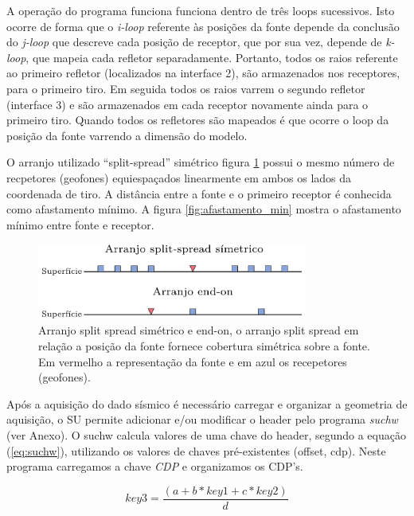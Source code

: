 A operação do programa funciona funciona dentro de três loops sucessivos. Isto ocorre de forma que o \textit{i-loop} referente às posições da fonte depende da conclusão do \textit{j-loop} que descreve cada posição de receptor, que por sua vez, depende de \textit{k-loop}, que mapeia cada refletor separadamente. Portanto, todos os raios referente ao primeiro refletor (localizados na interface 2), são armazenados nos receptores, para o primeiro tiro. Em seguida todos os raios varrem o segundo refletor (interface 3) e são armazenados em cada receptor novamente ainda para o primeiro tiro. Quando todos os refletores são mapeados é que ocorre o loop da posição da fonte varrendo a dimensão do modelo.

O arranjo utilizado ``split-spread'' simétrico figura \ref{fig:split_spread} possui o mesmo número de recpetores (geofones) equiespaçados linearmente em ambos os lados da coordenada de tiro. A distância entre a fonte e o primeiro receptor é conhecida como afastamento mínimo. A figura \ref{fig:afastamento_min} mostra o afastamento mínimo entre fonte e receptor.

\begin{figure}[H]
\centering
\includegraphics[height=2.5cm]{figuras/cap2/arranjo.pdf}
\caption{Arranjo split spread simétrico e end-on, o arranjo split spread em relação a posição da fonte fornece cobertura simétrica sobre a fonte. Em vermelho a representação da fonte e em azul os recepetores (geofones).}
\label{fig:split_spread}
\end{figure}

Após a aquisição do dado sísmico é necessário carregar e organizar a geometria de aquisição, o SU permite adicionar e/ou modificar o header pelo programa \textit{suchw} (ver Anexo). O suchw calcula valores de uma chave do header, segundo a equação (\ref{eq:suchw}), utilizando os valores de chaves pré-existentes (offset, cdp). Neste programa carregamos a chave \textit{CDP} e organizamos os CDP's.

\begin{equation}
key3=\frac{(a+b*key1+c*key2)}{d}
\label{eq:suchw} 
\end{equation}

